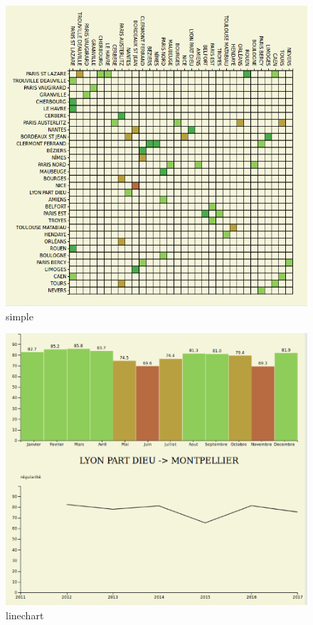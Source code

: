 \documentclass{vgtc}
\begin{document}
\begin{figure}[h!]
 \includegraphics[width=\columnwidth]{intersimp}
 \caption{simple}
 \label{fig:intersimp}
\end{figure}
\begin{figure}[h!]
 \includegraphics[width=\columnwidth]{hist_line}
 \caption{linechart}
 \label{fig:hist_line}
\end{figure}
\end{document}
